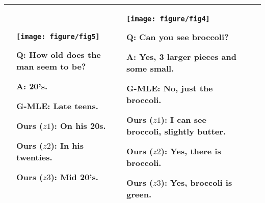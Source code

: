 \documentclass{article}
\begin{document}
\begin{table}[t]
\begin{center}
\begin{tabular}{p{3.0cm} p{3.0cm} p{3.0cm} p{3.0cm} p{2.5cm}}
\begin{minipage}{2.8cm}
\begin{compactenum}[\hspace{-6pt}]
    \end{compactenum}
    \end{minipage}
    &
    \vspace{-10pt}
    \center
    \texttt{[image: figure/fig5]}
    \newline\vspace{-10pt}    
    \begin{minipage}{2.8cm}
    \begin{compactenum}[\hspace{-6pt}]
    \tiny
    \item \tiny \textbf{Q}: How old does the man seem to be?
    \item \tiny \textbf{A}: 20's.
	\item \tiny \textbf{G-MLE}: Late teens.
	\item \tiny \textbf{Ours ($z1$)}: On his 20s.
	\item \tiny \textbf{Ours ($z2$)}: In his twenties.
	\item \tiny \textbf{Ours ($z3$)}: Mid 20's.
    \end{compactenum}
    \end{minipage}
    &
    \vspace{-10pt}
    \center
    \texttt{[image: figure/fig4]}
    \newline\vspace{-10pt}    
    \begin{minipage}{2.8cm}
    \begin{compactenum}[\hspace{-6pt}]
    \tiny
    \item \tiny \textbf{Q}: Can you see broccoli?
    \item \tiny \textbf{A}: Yes, 3 larger pieces and some small.
	\item \tiny \textbf{G-MLE}: No, just the broccoli.
	\item \tiny \textbf{Ours ($z1$)}: I can see broccoli, slightly butter.
	\item \tiny \textbf{Ours ($z2$)}: Yes, there is broccoli.
	\item \tiny \textbf{Ours ($z3$)}: Yes, broccoli is green.
    \end{compactenum}
    \end{minipage}
	\vspace{3mm}
	\tabularnewline
    \bottomrule
    \end{tabular}\\\end{center}
    \vspace{-4mm}
\end{table} 
\end{document}
